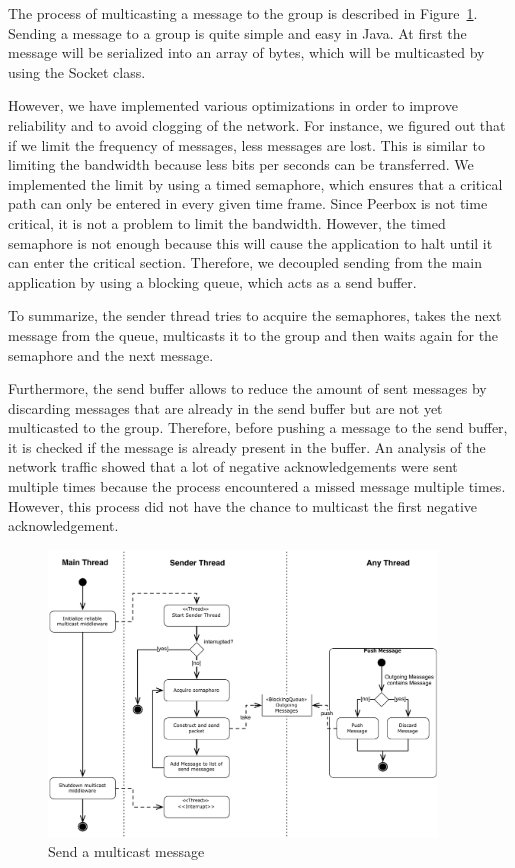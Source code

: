 The process of multicasting a message to the group is described in Figure~\ref{fig:sendMessage}. Sending a message to a group is quite simple and easy in Java. At first the message will be serialized into an array of bytes, which will be multicasted by using the Socket class. 

However, we have implemented various optimizations in order to improve reliability and to avoid clogging of the network. For instance, we figured out that if we limit the frequency of messages, less messages are lost. This is similar to limiting the bandwidth because less bits per seconds can be transferred.  
We implemented the limit by using a timed semaphore, which ensures that a critical path can only be entered in every given time frame. Since Peerbox is not time critical, it is not a  problem to limit the bandwidth. 
However, the timed semaphore is not enough because this will cause the application to halt until it can enter the critical section. Therefore, we decoupled  sending from the main application by using a blocking queue, which acts as a send buffer. 

To summarize, the sender thread tries to acquire the semaphores, takes the next message from the queue, multicasts it to the group and then waits again for the semaphore and the next message. 

Furthermore, the send buffer allows to reduce the amount of sent messages by discarding messages that are already in the send buffer but are not yet  multicasted to the group. Therefore, before pushing a message to the send buffer, it is checked if the message is already present in the buffer.
An analysis of the network traffic showed that a lot of negative acknowledgements were sent multiple times because the process encountered a missed message multiple times. However, this process did not have the chance to multicast the first negative acknowledgement.

\begin{figure}[htbp]
    \centering
        \includegraphics[height=3in]{figures/sendMessage.pdf}
    \caption{Send a multicast message}
    \label{fig:sendMessage}
\end{figure}
  
